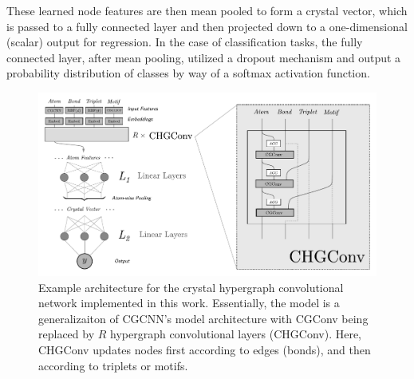 \documentclass[10pt,a4paper,twocolumn]{article}
\begin{document}
These learned node features are then mean pooled to form a crystal vector, which is passed to a fully connected layer and then projected down to a one-dimensional (scalar) output for regression. In the case of classification tasks, the fully connected layer, after mean pooling, utilized a dropout mechanism and output a probability distribution of classes by way of a softmax activation function.

\begin{figure}
	\centering
	\includegraphics[scale=.75]{arch_horiz.pdf}
	\caption{Example architecture for the crystal hypergraph convolutional network implemented in this work. Essentially, the model is a generalizaiton of CGCNN's \cite{cgcnn} model architecture with CGConv being replaced by $R$ hypergraph convolutional layers (CHGConv). Here, CHGConv updates nodes first according to edges (bonds), and then according to triplets or motifs. }
	\label{fig:architecture}
\end{figure}
\end{document}
